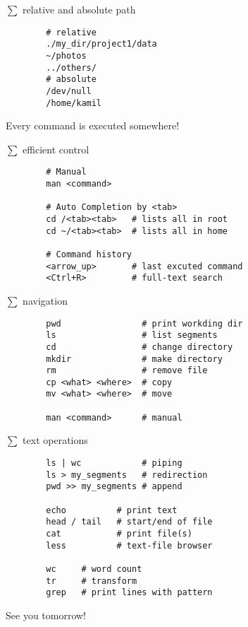 \documentclass[xcolor=dvipsnames]{beamer}
\begin{document}
\begin{frame}[fragile]
	$\sum$ relative and absolute path
	\Large
	\begin{verbatim}
		# relative
		./my_dir/project1/data
		~/photos
		../others/
		# absolute
		/dev/null
		/home/kamil
	\end{verbatim}
	Every command is executed somewhere!
\end{frame}

\begin{frame}[fragile]
	$\sum$ efficient control
	\Large
	\begin{verbatim}
		# Manual
		man <command>

		# Auto Completion by <tab>
		cd /<tab><tab>   # lists all in root
		cd ~/<tab><tab>  # lists all in home

		# Command history
		<arrow_up>       # last excuted command
		<Ctrl+R>         # full-text search
	\end{verbatim}
\end{frame}

\begin{frame}[fragile]
	$\sum$ navigation
	\Large
	\begin{verbatim}
		pwd                # print workding dir
		ls                 # list segments
		cd                 # change directory
		mkdir              # make directory
		rm                 # remove file
		cp <what> <where>  # copy
		mv <what> <where>  # move

		man <command>      # manual
	\end{verbatim}
\end{frame}

\begin{frame}[fragile]
	$\sum$ text operations
	\Large
	\begin{verbatim}
		ls | wc            # piping
		ls > my_segments   # redirection
		pwd >> my_segments # append

		echo          # print text
		head / tail   # start/end of file
		cat           # print file(s)
		less          # text-file browser

		wc     # word count
		tr     # transform
		grep   # print lines with pattern
	\end{verbatim}
\end{frame}

\begin{frame}[fragile]
	\begin{center}
		\Huge
		See you tomorrow!
	\end{center}
\end{frame}
\end{document}
